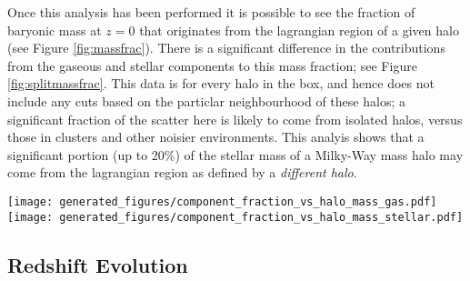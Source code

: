 Once this analysis has been performed it is possible to see the fraction of
baryonic mass at $z=0$ that originates from the lagrangian region of a given
halo (see Figure \ref{fig:massfrac}). There is a significant difference in the
contributions from the gaseous and stellar components to this mass fraction;
see Figure \ref{fig:splitmassfrac}. This data is for every halo in the box, and
hence does not include any cuts based on the particlar neighbourhood of these
halos; a significant fraction of the scatter here is likely to come from
isolated halos, versus those in clusters and other noisier environments. This
analyis shows that a significant portion (up to 20\%) of the stellar mass of a
Milky-Way mass halo may come from the lagrangian region as defined by a
\emph{different halo}.


\begin{figure*} \centering
	\texttt{[image: generated\_figures/component\_fraction\_vs\_halo\_mass\_gas.pdf]}
	\texttt{[image: generated\_figures/component\_fraction\_vs\_halo\_mass\_stellar.pdf]}
	\caption{Left: fraction of gaseous mass at $z=0$ in each halo from each
	component; right: fraction of stellar mass at $z=0$ from each
	component. Note that there is significantly more transfer shown in the
	gaseous component. Gas that is transferred between lagrangian regions
	must be given time to cool before being able to form stars. As the
	events that enable transfer are typically very energetic (AGN, stellar
	feedback, accretion), it is unlikely that the cooling time will be
	short enough to form stars by the end of the simulation for most
	transfer.} \label{fig:splitmassfrac} \end{figure*}

\subsection{Redshift Evolution}


